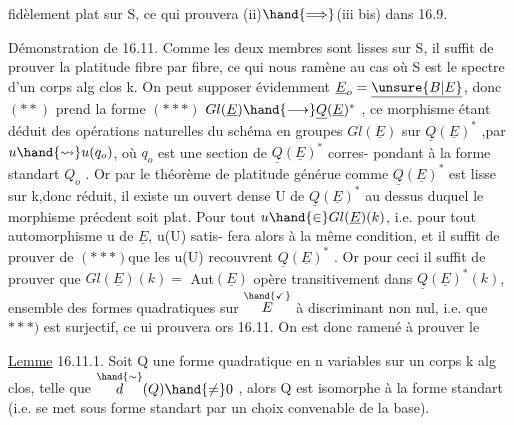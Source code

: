 
fidèlement plat sur S, ce qui prouvera  (ii)$\hand{\Longrightarrow}$(iii bis) dans  16.9.

Démonstration de 16.11.  Comme les deux membres sont lisses sur S,
il suffit de prouver la platitude fibre par fibre, ce qui nous ramène au
cas où S est le spectre d'un corps alg clos k.  On peut  supposer
évidemment $\underline{E}_o=\underline{\unsure{B|E}}$, donc $(**)$ prend la forme
$(***)$   $Gl(\underline{E})\hand{\longrightarrow}\underline{Q}(\underline{E})^*$ ,
ce morphisme étant déduit des opérations naturelles du schéma en groupes
$Gl(\underline{E})$ sur $\underline{Q}(\underline{E})^*$ ,par $u\hand{\rightsquigarrow} u(q_o)$, où $q_o$ est une section de $\underline{Q}(\underline{E})^*$ corres-%
pondant à la forme standart $Q_o$ . Or par le théorème de platitude générue\hand{,}
comme $\underline{Q}(\underline{E})^*$ est lisse sur k,donc réduit, il existe un ouvert dense U de
$\underline{Q}(\underline{E})^*$ au dessus duquel le morphisme précdent soit plat.  Pour tout 
$u\hand{\in}Gl(\underline{E})(k)$, i.e. pour tout automorphisme u de $\underline{E}$, u(U) satis-%
fera alors à la même condition, et il suffit\hand{$\unsure{\leftarrow}$} de prouver\hand{,} \hand{$\downarrow$}
de $(***)$\hand{,}que les u(U) recouvrent $\underline{Q}(\underline{E})^*$ . Or pour ceci il suffit de prouver
que $Gl(\underline{E})(k)=$ Aut$(\underline{E})$ opère transitivement dans $\underline{Q}(\underline{E})^*(k)$, ensemble des
formes quadratiques  sur $\overset{\hand{\checkmark}}{E}$ à discriminant non nul,  i.e. que
\unsure{\deleted{(}}$***)$ est surjectif, ce ui prouvera ors 16.11.  On est donc ramené à
prouver le

\uline{Lemme} 16.11.1.  Soit Q une forme quadratique en n variables sur un corps k
alg clos, telle que $\overset{\hand{\sim}}{d}(Q)\hand{\neq} 0$ , alors Q est isomorphe à la forme standart
(i.e. se met sous forme standart par un choix convenable de la base).

